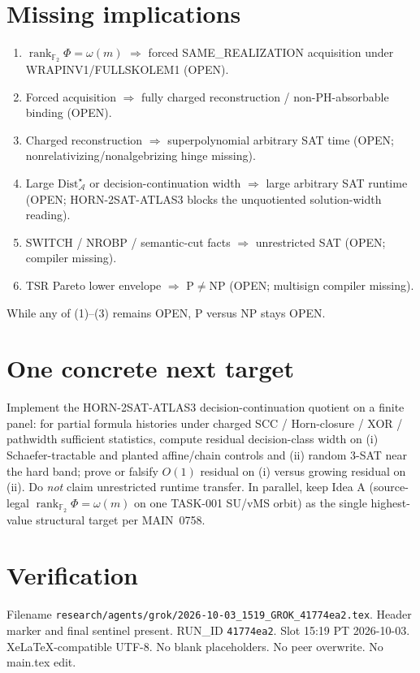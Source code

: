\documentclass[11pt]{article}
\begin{document}
\section*{Missing implications}
\begin{enumerate}
\item $\operatorname{rank}_{\mathbb F_2}\Phi=\omega(m)$ $\Rightarrow$ forced SAME\_REALIZATION acquisition
  under WRAPINV1/FULLSKOLEM1 (OPEN).
\item Forced acquisition $\Rightarrow$ fully charged reconstruction / non-PH-absorbable binding
  (OPEN).
\item Charged reconstruction $\Rightarrow$ superpolynomial arbitrary SAT time (OPEN;
  nonrelativizing/nonalgebrizing hinge missing).
\item Large $\mathrm{Dist}_{\mathcal A}^\star$ or decision-continuation width $\Rightarrow$ large
  arbitrary SAT runtime (OPEN; HORN-2SAT-ATLAS3 blocks the unquotiented solution-width
  reading).
\item SWITCH / NROBP / semantic-cut facts $\Rightarrow$ unrestricted SAT (OPEN; compiler missing).
\item TSR Pareto lower envelope $\Rightarrow$ P$\neq$NP (OPEN; multisign compiler missing).
\end{enumerate}
While any of (1)--(3) remains OPEN, P versus NP stays OPEN.

\section*{One concrete next target}
Implement the HORN-2SAT-ATLAS3 decision-continuation quotient on a finite panel:
for partial formula histories under charged SCC / Horn-closure / XOR / pathwidth
sufficient statistics, compute residual decision-class width on
(i) Schaefer-tractable and planted affine/chain controls and
(ii) random 3-SAT near the hard band;
prove or falsify $O(1)$ residual on (i) versus growing residual on (ii).
Do \emph{not} claim unrestricted runtime transfer.
In parallel, keep Idea A (source-legal $\operatorname{rank}_{\mathbb F_2}\Phi=\omega(m)$ on one
TASK-001 SU/vMS orbit) as the single highest-value structural target per MAIN~0758.

\section*{Verification}
Filename \texttt{research/agents/grok/2026-10-03\_1519\_GROK\_41774ea2.tex}.
Header marker and final sentinel present.
RUN\_ID \texttt{41774ea2}. Slot 15:19 PT 2026-10-03.
XeLaTeX-compatible UTF-8. No blank placeholders. No peer overwrite. No main.tex edit.

\end{document}
